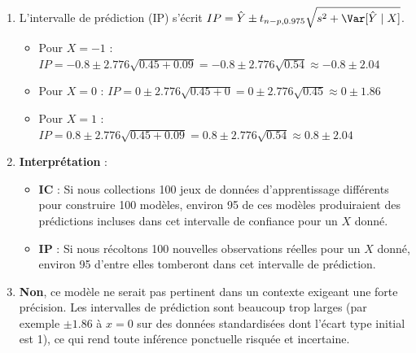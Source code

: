\documentclass[]{../exercices}
\begin{document}
\begin{solution}
\begin{enumerate}
		\item L'intervalle de prédiction (IP) s'écrit $IP = \hat{Y} \pm t_{n-p, 0.975} \sqrt{s^2 + \Var[\hat{Y} \mid X]}$.
		\begin{itemize}
			\item Pour $X = -1$ : $IP = -0.8 \pm 2.776 \sqrt{0.45 + 0.09} = -0.8 \pm 2.776 \sqrt{0.54} \approx -0.8 \pm 2.04$
			\item Pour $X = 0$ : $IP = 0 \pm 2.776 \sqrt{0.45 + 0} = 0 \pm 2.776 \sqrt{0.45} \approx 0 \pm 1.86$
			\item Pour $X = 1$ : $IP = 0.8 \pm 2.776 \sqrt{0.45 + 0.09} = 0.8 \pm 2.776 \sqrt{0.54} \approx 0.8 \pm 2.04$
		\end{itemize}

		\item \textbf{Interprétation} :
		\begin{itemize}
			\item \textbf{IC} : Si nous collections 100 jeux de données d'apprentissage différents pour construire 100 modèles, environ 95 de ces modèles produiraient des prédictions incluses dans cet intervalle de confiance pour un $X$ donné.
			\item \textbf{IP} : Si nous récoltons 100 nouvelles observations réelles pour un $X$ donné, environ 95 d'entre elles tomberont dans cet intervalle de prédiction.
		\end{itemize}

		\item \textbf{Non}, ce modèle ne serait pas pertinent dans un contexte exigeant une forte précision. Les intervalles de prédiction sont beaucoup trop larges (par exemple $\pm 1.86$ à $x=0$ sur des données standardisées dont l'écart type initial est 1), ce qui rend toute inférence ponctuelle risquée et incertaine.
	\end{enumerate}
\end{solution}
\end{document}
